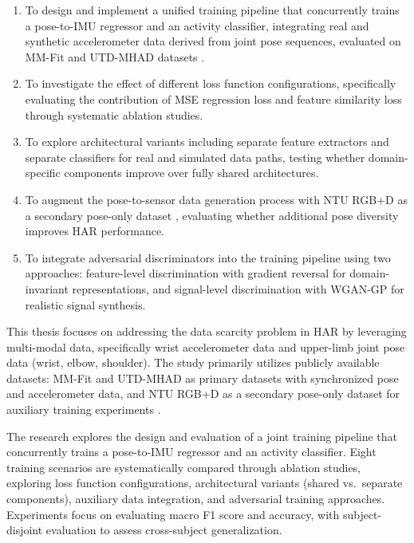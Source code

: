 \begin{enumerate}
    \item To design and implement a unified training pipeline that concurrently trains a pose-to-IMU regressor and an activity classifier, integrating real and synthetic accelerometer data derived from joint pose sequences, evaluated on MM-Fit and UTD-MHAD datasets \cite{stromback2020mm, chen2015utd}.

    \item To investigate the effect of different loss function configurations, specifically evaluating the contribution of MSE regression loss and feature similarity loss through systematic ablation studies.

    \item To explore architectural variants including separate feature extractors and separate classifiers for real and simulated data paths, testing whether domain-specific components improve over fully shared architectures.

    \item To augment the pose-to-sensor data generation process with NTU RGB+D as a secondary pose-only dataset \cite{shahroudy2016ntu}, evaluating whether additional pose diversity improves HAR performance.

    \item To integrate adversarial discriminators into the training pipeline using two approaches: feature-level discrimination with gradient reversal \cite{ganin2016domain} for domain-invariant representations, and signal-level discrimination with WGAN-GP \cite{arjovsky2017wasserstein, gulrajani2017improved} for realistic signal synthesis.
\end{enumerate}


This thesis focuses on addressing the data scarcity problem in HAR by leveraging multi-modal data, specifically wrist accelerometer data and upper-limb joint pose data (wrist, elbow, shoulder). The study primarily utilizes publicly available datasets: MM-Fit and UTD-MHAD as primary datasets with synchronized pose and accelerometer data, and NTU RGB+D as a secondary pose-only dataset for auxiliary training experiments \cite{stromback2020mm, chen2015utd, shahroudy2016ntu}.

The research explores the design and evaluation of a joint training pipeline that concurrently trains a pose-to-IMU regressor and an activity classifier. Eight training scenarios are systematically compared through ablation studies, exploring loss function configurations, architectural variants (shared vs.\ separate components), auxiliary data integration, and adversarial training approaches. Experiments focus on evaluating macro F1 score and accuracy, with subject-disjoint evaluation to assess cross-subject generalization.

